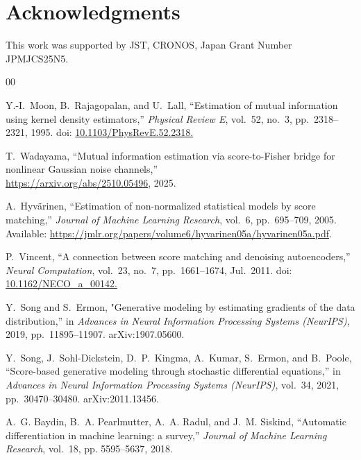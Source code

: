 \documentclass[conference]{IEEEtran}
\begin{document}
\section*{Acknowledgments}
This work was supported by JST, CRONOS, Japan Grant Number JPMJCS25N5.


\begin{thebibliography}{00}

Y.-I.~Moon, B.~Rajagopalan, and U.~Lall,
``Estimation of mutual information using kernel density estimators,''
\textit{Physical Review E}, vol.~52, no.~3, pp.~2318--2321, 1995.
doi: \href{https://doi.org/10.1103/PhysRevE.52.2318.}{10.1103/PhysRevE.52.2318.}
  

T.~Wadayama, 
``Mutual information estimation via score-to-Fisher bridge
for nonlinear Gaussian noise channels,''\\
\url{https://arxiv.org/abs/2510.05496}, 2025.

A.~Hyv\"{a}rinen,
``Estimation of non-normalized statistical models by score matching,''
\textit{Journal of Machine Learning Research}, vol.~6, pp.~695--709, 2005.\\
Available: \url{https://jmlr.org/papers/volume6/hyvarinen05a/hyvarinen05a.pdf}.

P.~Vincent,
``A connection between score matching and denoising autoencoders,''
\textit{Neural Computation}, vol.~23, no.~7, pp.~1661--1674, Jul.~2011.
doi: \href{https://doi.org/10.1162/NECO\_a\_00142.}{10.1162/NECO\_a\_00142.}

Y.~Song and S.~Ermon,
"Generative modeling by estimating gradients of the data distribution,''
in \textit{Advances in Neural Information Processing Systems (NeurIPS)}, 2019, pp.~11895--11907.
arXiv:1907.05600.

Y.~Song, J.~Sohl-Dickstein, D.~P.~Kingma, A.~Kumar, S.~Ermon, and B.~Poole,
``Score-based generative modeling through stochastic differential equations,''
in \textit{Advances in Neural Information Processing Systems (NeurIPS)}, vol.~34, 2021, pp.~30470--30480.
arXiv:2011.13456.

A.~G. Baydin, B.~A. Pearlmutter, A.~A. Radul,  and J.~M. Siskind, ``Automatic
  differentiation in machine learning: a survey,'' \emph{Journal of Machine
  Learning Research}, vol.~18, pp. 5595--5637, 2018.


\end{thebibliography}
\end{document}
